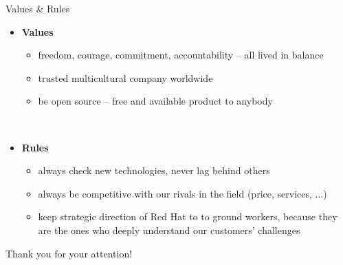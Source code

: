 \documentclass[]{beamer}
\begin{document}
    \begin{frame}{Values \& Rules}
      \begin{adjustwidth}{-5mm}{0mm}
        \begin{itemize}
          \item \textbf{Values}
            \begin{itemize}
              \item freedom, courage, commitment, accountability -- all lived in balance
              \item trusted multicultural company worldwide
              \item be open source -- free and available product to anybody
            \end{itemize}

          \hfill\\[2mm]

          \item \textbf{Rules}
            \begin{itemize}
              \item always check new technologies, never lag behind others
              \item always be competitive with our rivals in the field (price, services, ...)
              \item keep strategic direction of Red Hat to to ground workers, because they are the ones who deeply understand our customers’ challenges
            \end{itemize}
        \end{itemize}
      \end{adjustwidth}
    \end{frame}


\begin{frame}[plain]
  \vspace{20mm}
  \centerline{Thank you for your attention!}
\end{frame}
\end{document}
